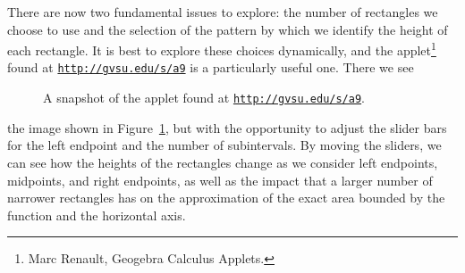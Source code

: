 There are now two fundamental issues to explore:  the number of rectangles we choose to use and the selection of the pattern by which we identify the height of each rectangle.  It is best to explore these choices dynamically, and the applet\footnote{Marc Renault, Geogebra Calculus Applets.} found at \href{http://gvsu.edu/s/a9}{\texttt{http://gvsu.edu/s/a9}} is a particularly useful one.  There we see
\begin{figure}[h]
\begin{center}
\caption{A snapshot of the applet found at \href{http://gvsu.edu/s/a9}{\texttt{http://gvsu.edu/s/a9}}.} \label{F:4.2.RenaultAppletRS}
\end{center}
\end{figure}
the image shown in Figure~\ref{F:4.2.RenaultAppletRS}, but with the opportunity to adjust the slider bars for the left endpoint and the number of subintervals.  By moving the sliders, we can see how the heights of the rectangles change as we consider left endpoints, midpoints, and right endpoints, as well as the impact that a larger number of narrower rectangles has on the approximation of the exact area bounded by the function and the horizontal axis.  

